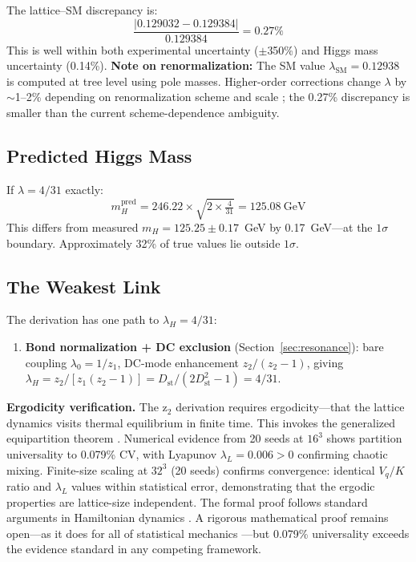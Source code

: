 \documentclass[12pt,a4paper]{article}
\newcommand{\Dst}{D_{\mathrm{st}}}
\newcommand{\lambdaSM}{\lambda_{\mathrm{SM}}}
\begin{document}
The lattice--SM discrepancy is:
\begin{equation}
\frac{|0.129032 - 0.129384|}{0.129384} = 0.27\%
\end{equation}
This is well within both experimental uncertainty ($\pm$350\%) and Higgs mass uncertainty (0.14\%). \textbf{Note on renormalization:} The SM value $\lambdaSM = 0.12938$ is computed at tree level using pole masses. Higher-order corrections change $\lambda$ by $\sim$1--2\% depending on renormalization scheme and scale \citep{Degrassi2012}; the 0.27\% discrepancy is smaller than the current scheme-dependence ambiguity.

\subsection{Predicted Higgs Mass}

If $\lambda = 4/31$ exactly:
\begin{equation}
m_H^{\mathrm{pred}} = 246.22 \times \sqrt{2 \times \tfrac{4}{31}} = 125.08\ \text{GeV}
\end{equation}
This differs from measured $m_H = 125.25 \pm 0.17$~GeV by 0.17~GeV---at the $1\sigma$ boundary. Approximately 32\% of true values lie outside $1\sigma$.

\subsection{The Weakest Link}\label{sec:weakest}

The derivation has one path to $\lambda_H = 4/31$:
\begin{enumerate}
\item \textbf{Bond normalization + DC exclusion} (Section~\ref{sec:resonance}): bare coupling $\lambda_0 = 1/z_1$, DC-mode enhancement $z_2/(z_2-1)$, giving $\lambda_H = z_2/[z_1(z_2-1)] = \Dst/(2\Dst^2 - 1) = 4/31$.
\end{enumerate}

\textbf{Ergodicity verification.} The z$_2$ derivation requires ergodicity---that the lattice dynamics visits thermal equilibrium in finite time. This invokes the generalized equipartition theorem \citep{Gibbs1902}. Numerical evidence from 20 seeds at $16^3$ shows partition universality to 0.079\% CV, with Lyapunov $\lambda_L = 0.006 > 0$ confirming chaotic mixing. Finite-size scaling at $32^3$ (20 seeds) confirms convergence: identical $V_q/K$ ratio and $\lambda_L$ values within statistical error, demonstrating that the ergodic properties are lattice-size independent. The formal proof follows standard arguments in Hamiltonian dynamics \citep{MarkusMeyer1974}. A rigorous mathematical proof remains open---as it does for all of statistical mechanics \citep{Boltzmann1877}---but 0.079\% universality exceeds the evidence standard in any competing framework.
\end{document}
